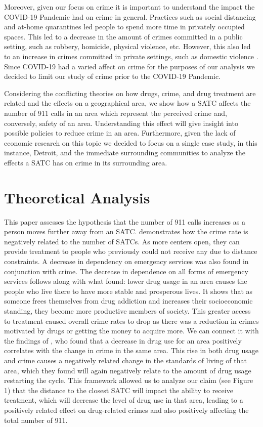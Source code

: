 \documentclass[12pt]{article}
\begin{document}
Moreover, given our focus on crime it is important to understand the impact the COVID-19 Pandemic had on crime in general. Practices such as social distancing and at-home quarantines led people to spend more time in privately occupied spaces. This led to a decrease in the amount of crimes committed in a public setting, such as robbery, homicide, physical violence, etc. However, this also led to an increase in crimes committed in private settings, such as domestic violence \cite{covid_and_crime}. Since COVID-19 had a varied affect on crime for the purposes of our analysis we decided to limit our study of crime prior to the COVID-19 Pandemic.

Considering the conflicting theories on how drugs, crime, and drug treatment are related and the effects on a geographical area, we show how a SATC affects the number of 911 calls in an area which represent the perceived crime and, conversely, safety of an area. Understanding this effect will give insight into possible policies to reduce crime in an area. Furthermore, given the lack of economic research on this topic we decided to focus on a single case study, in this instance, Detroit, and the immediate surrounding communities to analyze the effects a SATC has on crime in its surrounding area. 

\section{Theoretical Analysis}
\label{sec:theory}
This paper assesses the hypothesis that the number of 911 calls increases as a person moves further away from an SATC. \cite{SAT_centers_and_crime} demonstrates how the crime rate is negatively related to the number of SATCs. As more centers open, they can provide treatment to people who previously could not receive any due to distance constraints. A decrease in dependency on emergency services was also found in conjunction with crime. The decrease in dependence on all forms of emergency services follows along with what \cite{Socioeconomic-Determinants} found: lower drug usage in an area causes the people who live there to have more stable and prosperous lives. It shows that as someone frees themselves from drug addiction and increases their socioeconomic standing, they become more productive members of society. This greater access to treatment caused overall crime rates to drop as there was a reduction in crimes motivated by drugs or getting the money to acquire more. We can connect it with the findings of \cite{drugs_and_crime}, who found that a decrease in drug use for an area positively correlates with the change in crime in the same area. This rise in both drug usage and crime causes a negatively related change in the standards of living of that area, which they found will again negatively relate to the amount of drug usage restarting the cycle. This framework allowed us to analyze our claim (see Figure 1) that the distance to the closest SATC will impact the ability to receive treatment, which will decrease the level of drug use in that area, leading to a positively related effect on drug-related crimes and also positively affecting the total number of 911.
\end{document}
